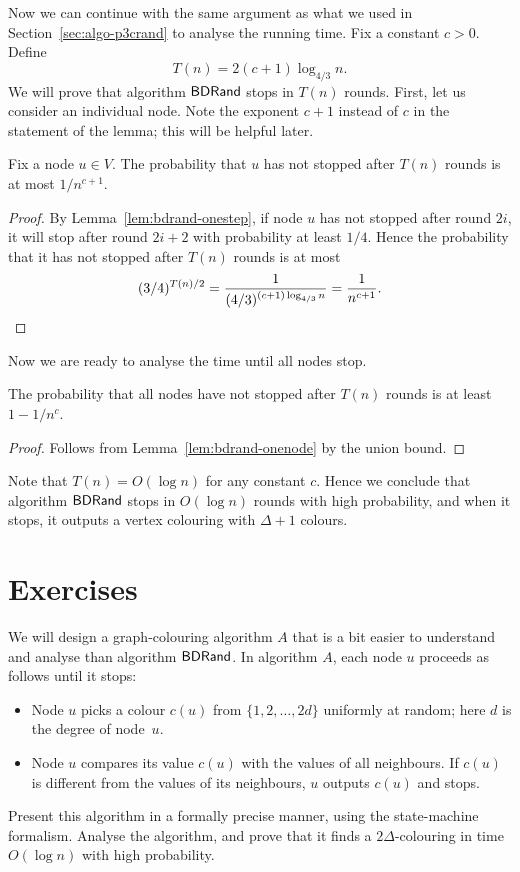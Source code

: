 Now we can continue with the same argument as what we used in Section~\ref{sec:algo-p3crand} to analyse the running time. Fix a constant $c > 0$. Define
\[
    T(n) = 2(c+1) \log_{4/3} n.
\]
We will prove that algorithm $\textup{\sffamily BDRand}$ stops in $T(n)$ rounds. First, let us consider an individual node. Note the exponent $c+1$ instead of $c$ in the statement of the lemma; this will be helpful later.

\begin{lemma}\label{lem:bdrand-onenode}
    Fix a node $u \in V$. The probability that $u$ has not stopped after $T(n)$ rounds is at most $1/n^{c+1}$.
\end{lemma}
\begin{proof}
    By Lemma~\ref{lem:bdrand-onestep}, if node $u$ has not stopped after round $2i$, it will stop after round $2i+2$ with probability at least $1/4$. Hence the probability that it has not stopped after $T(n)$ rounds is at most
    \[
        (3/4)^{T(n)/2} = \frac{1}{(4/3)^{(c+1) \log_{4/3} n}} = \frac{1}{n^{c+1}}. \qedhere
    \]
\end{proof}

Now we are ready to analyse the time until all nodes stop.

\begin{theorem}\label{thm:bdrand}
    The probability that all nodes have not stopped after $T(n)$ rounds is at least $1 - 1/n^c$.
\end{theorem}
\begin{proof}
    Follows from Lemma~\ref{lem:bdrand-onenode} by the union bound.
\end{proof}

Note that $T(n) = O(\log n)$ for any constant $c$. Hence we conclude that algorithm $\textup{\sffamily BDRand}$ stops in $O(\log n)$ rounds with high probability, and when it stops, it outputs a vertex colouring with $\Delta+1$ colours.


\section{Exercises}

\begin{ex}\label{ex:bdrand2delta}
    We will design a graph-colouring algorithm $A$ that is a bit easier to understand and analyse than algorithm $\textup{\sffamily BDRand}$. In algorithm $A$, each node $u$ proceeds as follows until it stops:
    \begin{itemize}
        \item Node $u$ picks a colour $c(u)$ from $\{1,2,\dotsc,2d\}$ uniformly at random; here $d$ is the degree of node~$u$.
        \item Node $u$ compares its value $c(u)$ with the values of all neighbours. If $c(u)$ is different from the values of its neighbours, $u$ outputs $c(u)$ and stops.
    \end{itemize}
    Present this algorithm in a formally precise manner, using the state-machine formalism. Analyse the algorithm, and prove that it finds a $2\Delta$-colouring in time $O(\log n)$ with high probability.
\end{ex}


